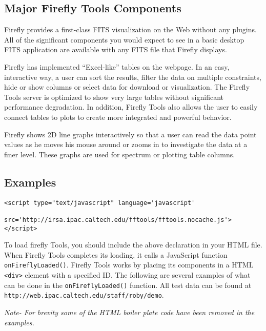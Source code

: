 \subsection{Major Firefly Tools Components}

Firefly provides a first-class FITS visualization on the Web without any plugins. All of the significant components you would expect to see in a basic desktop FITS application are available with any FITS file that Firefly displays.

Firefly has implemented “Excel-like” tables on the webpage. In an easy, interactive way, a user can sort the results, filter the data on multiple constraints, hide or show columns or select data for download or visualization. The Firefly Tools server is optimized to show very large tables without significant performance degradation. In addition, Firefly Tools also allows the user to easily connect tables to plots to create more integrated and powerful behavior.

Firefly shows 2D line graphs interactively so that a user can read the data point values as he moves his mouse around or zooms in to investigate the data at a finer level. These graphs are used for spectrum or plotting table columns. 


\subsection{Examples}

\scriptsize
\begin{verbatim}
<script type="text/javascript" language='javascript'
           src='http://irsa.ipac.caltech.edu/fftools/fftools.nocache.js'> </script>
\end{verbatim}
\normalsize
To load firefly Tools, you should include the above declaration in your HTML file. When Firefly Tools completes its loading, it calls a JavaScript function \scriptsize \texttt{onFireflyLoaded()}\normalsize. Firefly Tools works by placing its components in a HTML \scriptsize\texttt{<div>} \normalsize element with a specified ID. The following are several examples of what can be done in the \scriptsize \texttt{onFireflyLoaded()} \normalsize function. All test data can be found at \texttt{http://web.ipac.caltech.edu/staff/roby/demo}.

\textit{Note- For brevity some of the HTML boiler plate code have been removed in the examples.}


